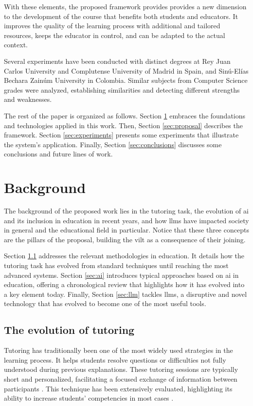 \documentclass[pdflatex,sn-mathphys-num]{sn-jnl}%
\begin{document}
With these elements, the proposed framework provides provides a new dimension to the development of the course that benefits both students and educators. It improves the quality of the learning process with additional and tailored resources, keeps the educator in control, and can be adapted to the actual context.

Several experiments have been conducted with distinct degrees at Rey Juan Carlos University and Complutense University of Madrid in Spain, and Sin\'u-El\'ias Bechara Zain\'um University in Colombia. Similar subjects from Computer Science grades were analyzed, establishing similarities and detecting different strengths and weaknesses.

The rest of the paper is organized as follows. Section \ref{sec:background} embraces the foundations and technologies applied in this work. Then, Section \ref{sec:proposal} describes the framework. Section \ref{sec:experiments} presents some experiments that illustrate the system's application. Finally, Section \ref{sec:conclusions} discusses some conclusions and future lines of work.


\section{Background}
\label{sec:background}
The background of the proposed work lies in the tutoring task, the evolution of \ac{ai} and its inclusion in education in recent years, and how \acp{llm} have impacted society in general and the educational field in particular. Notice that these three concepts are the pillars of the proposal, building the \ac{vilt} as a consequence of their joining.

Section \ref{sec:tutoring} addresses the relevant methodologies in education. It details how the tutoring task has evolved from standard techniques until reaching the most advanced systems. 
Section \ref{sec:ai} introduces typical approaches based on \ac{ai} in education, offering a chronological review that highlights how it has evolved into a key element today. Finally, Section \ref{sec:llm} tackles \acp{llm}, a disruptive and novel technology that has evolved to become one of the most useful tools.


\subsection{The evolution of tutoring}
\label{sec:tutoring}
Tutoring has traditionally been one of the most widely used strategies in the learning process. It helps students resolve questions or difficulties not fully understood during previous explanations. These tutoring sessions are typically short and personalized, facilitating a focused exchange of information between participants \cite{grey2020perceptions}. This technique has been extensively evaluated, highlighting its ability to increase students' competencies in most cases \cite{lopez2020school}. 
\end{document}
